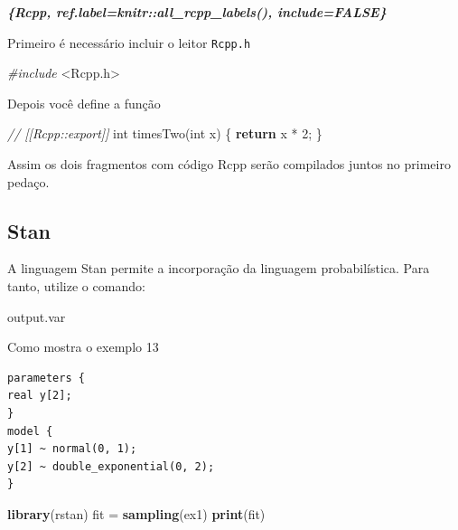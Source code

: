 \documentclass[
]{book}
\newenvironment{Shaded}{\begin{snugshade}}{\end{snugshade}}
\newcommand{\CommentTok}[1]{\textcolor[rgb]{0.56,0.35,0.01}{\textit{#1}}}
\newcommand{\ControlFlowTok}[1]{\textcolor[rgb]{0.13,0.29,0.53}{\textbf{#1}}}
\newcommand{\DataTypeTok}[1]{\textcolor[rgb]{0.13,0.29,0.53}{#1}}
\newcommand{\DecValTok}[1]{\textcolor[rgb]{0.00,0.00,0.81}{#1}}
\newcommand{\ImportTok}[1]{#1}
\newcommand{\InformationTok}[1]{\textcolor[rgb]{0.56,0.35,0.01}{\textbf{\textit{#1}}}}
\newcommand{\KeywordTok}[1]{\textcolor[rgb]{0.13,0.29,0.53}{\textbf{#1}}}
\newcommand{\NormalTok}[1]{#1}
\newcommand{\PreprocessorTok}[1]{\textcolor[rgb]{0.56,0.35,0.01}{\textit{#1}}}
\newcommand{\StringTok}[1]{\textcolor[rgb]{0.31,0.60,0.02}{#1}}
\begin{document}
\begin{Shaded}
\begin{Highlighting}[]
 \InformationTok{\textasciigrave{}\textasciigrave{}\textasciigrave{}\{Rcpp, ref.label=knitr::all\_rcpp\_labels(), include=FALSE\}}
\InformationTok{\textasciigrave{}\textasciigrave{}\textasciigrave{}}
\end{Highlighting}
\end{Shaded}

Primeiro é necessário incluir o leitor \texttt{Rcpp.h}

\begin{Shaded}
\begin{Highlighting}[]
\PreprocessorTok{\#include }\ImportTok{\textless{}Rcpp.h\textgreater{}}
\end{Highlighting}
\end{Shaded}

Depois você define a função

\begin{Shaded}
\begin{Highlighting}[]
\CommentTok{// [[Rcpp::export]]}
\DataTypeTok{int}\NormalTok{ timesTwo(}\DataTypeTok{int}\NormalTok{ x) \{}
\ControlFlowTok{return}\NormalTok{ x * }\DecValTok{2}\NormalTok{;}
\NormalTok{\}}
\end{Highlighting}
\end{Shaded}

Assim os dois fragmentos com código Rcpp serão compilados juntos no primeiro pedaço.

\hypertarget{stan}{%
\subsection{Stan}\label{stan}}

A linguagem Stan permite a incorporação da linguagem probabilística. Para tanto, utilize o comando:

output.var

Como mostra o exemplo 13

\begin{verbatim}
parameters {
real y[2];
}
model {
y[1] ~ normal(0, 1);
y[2] ~ double_exponential(0, 2);
}
\end{verbatim}

\begin{Shaded}
\begin{Highlighting}[]
\KeywordTok{library}\NormalTok{(rstan)}
\NormalTok{fit =}\StringTok{ }\KeywordTok{sampling}\NormalTok{(ex1)}
\KeywordTok{print}\NormalTok{(fit)}
\end{Highlighting}
\end{Shaded}
\end{document}
